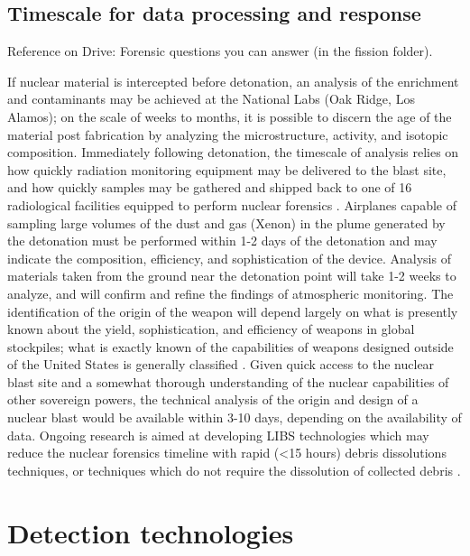 \documentclass{report}
\begin{document}
\subsection{Timescale for data processing and response}

Reference on Drive: Forensic questions you can answer (in the fission folder).

If nuclear material is intercepted before detonation, an analysis of the enrichment and contaminants may be achieved at the National Labs (Oak Ridge, Los Alamos); on the scale of weeks to months, it is possible to discern the age of the material post fabrication by analyzing the microstructure, activity, and isotopic composition. Immediately following detonation, the timescale of analysis relies on how quickly radiation monitoring equipment may be delivered to the blast site, and how quickly samples may be gathered and shipped back to one of 16 radiological facilities equipped to perform nuclear forensics \cite{1446400}. Airplanes capable of sampling large volumes of the dust and gas (Xenon) in the plume generated by the detonation must be performed within 1-2 days of the detonation and may indicate the composition, efficiency, and sophistication of the device. Analysis of materials taken from the ground near the detonation point will take 1-2 weeks to analyze, and will confirm and refine the findings of atmospheric monitoring. The identification of the origin of the weapon will depend largely on what is presently known about the yield, sophistication, and efficiency of weapons in global stockpiles; what is exactly known of the capabilities of weapons designed outside of the United States is generally classified \cite{Glasstone_1964}. Given quick access to the nuclear blast site and a somewhat thorough understanding of the nuclear capabilities of other sovereign powers, the technical analysis of the origin and design of a nuclear blast would be available within 3-10 days, depending on the availability of data. Ongoing research is aimed at developing LIBS technologies which may reduce the nuclear forensics timeline with rapid (\textless 15 hours) debris dissolutions techniques, or techniques which do not require the dissolution of collected debris \cite{Condron}. 






\section{Detection technologies }
\end{document}
